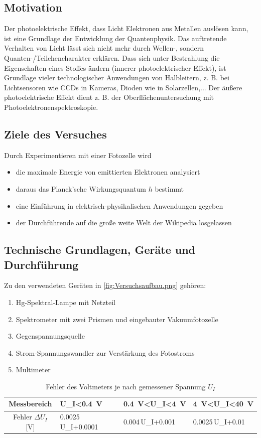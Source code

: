 \subsection{Motivation}
Der photoelektrische Effekt, dass Licht Elektronen aus Metallen auslösen kann, ist eine Grundlage der Entwicklung der Quantenphysik. Das auftretende Verhalten von Licht lässt sich nicht mehr durch Wellen-, sondern Quanten-/Teilchencharakter erklären. Dass sich unter Bestrahlung die Eigenschaften eines Stoffes ändern (innerer photoelektrischer Effekt), ist Grundlage vieler technologischer Anwendungen von Halbleitern, z. B. bei Lichtsensoren wie CCDs in Kameras, Dioden wie in Solarzellen,... Der äußere photoelektrische Effekt dient z. B. der Oberflächenuntersuchung mit Photoelektronenspektroskopie.

\subsection{Ziele des Versuches}
Durch Experimentieren mit einer Fotozelle wird
\begin{itemize}
    \item die maximale Energie von emittierten Elektronen analysiert
    \item daraus das Planck'sche Wirkungsquantum \(h\) bestimmt
    \item eine Einführung in elektrisch-physikalischen Anwendungen gegeben 
    \item der Durchführende auf die große weite Welt der Wikipedia losgelassen
\end{itemize}
\newpage

\subsection{Technische Grundlagen, Geräte und Durchführung}
Zu den verwendeten Geräten in \cref{fig:Versuchsaufbau.png} gehören:
\begin{enumerate}
    \item Hg-Spektral-Lampe mit Netzteil
    \item Spektrometer mit zwei Prismen und eingebauter Vakuumfotozelle
    \item Gegenspannungsquelle
    \item Strom-Spannungswandler zur Verstärkung des Fotostroms
    \item Multimeter
\end{enumerate}
\begin{table}[htbp]
    \centering 
    \caption{Fehler des Voltmeters je nach gemessener Spannung \(U_I\)}\vspace{0.5cm}
\begin{tabularx}{\textwidth}{cZZZ}
  \toprule
Messbereich & U_I<\qty{0.4}{\volt}  &  \qty{0.4}{\volt}<U_I<\qty{4}{\volt}  & \qty{4}{\volt}<U_I<\qty{40}{\volt} \\ \midrule
Fehler \(\Delta U_I\) [V]     & 0.0025\,U_I+0.0001 & 0.004\,U_I+0.001 & 0.0025\,U_I+0.01\\\bottomrule
\end{tabularx}
\label{table:FehlerVM}
\end{table}

